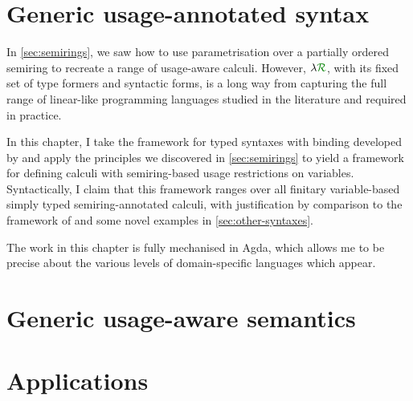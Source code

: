 \chapter{Generic usage-annotated syntax}\label{sec:framework}

In \cref{sec:semirings}, we saw how to use parametrisation over a partially
ordered semiring to recreate a range of usage-aware calculi.
However, $\name$, with its fixed set of type formers and syntactic forms, is a
long way from capturing the full range of linear-like programming languages
studied in the literature and required in practice.

In this chapter, I take the framework for typed syntaxes with binding developed
by \citet{AACMM21} and apply the principles we discovered in
\cref{sec:semirings} to yield a framework for defining calculi with
semiring-based usage restrictions on variables.
Syntactically, I claim that this framework ranges over all finitary
variable-based simply typed semiring-annotated calculi, with justification by
comparison to the framework of \citet{AACMM21} and some novel examples in
\cref{sec:other-syntaxes}.

The work in this chapter is fully mechanised in Agda, which allows me to be
precise about the various levels of domain-specific languages which appear.



\chapter{Generic usage-aware semantics}\label{sec:semantics}



\chapter{Applications}\label{sec:example-semantics}


